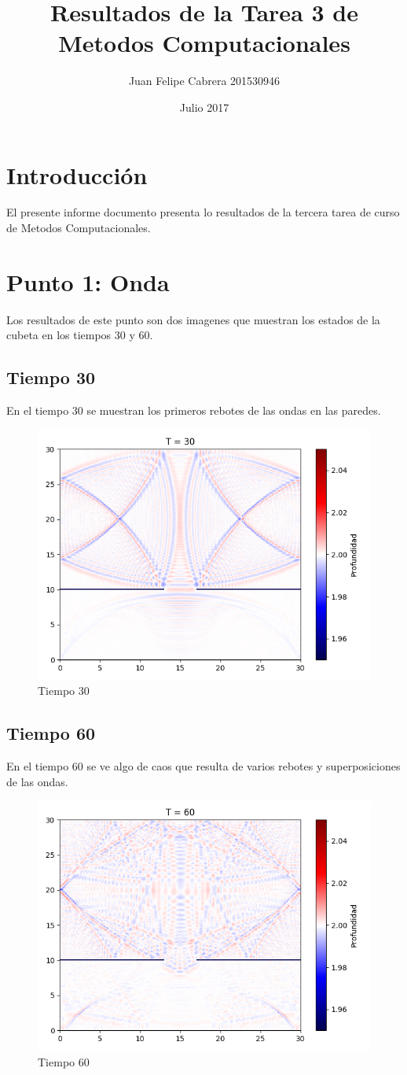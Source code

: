 \documentclass{article}
\title{Resultados de la Tarea 3 de Metodos Computacionales}
\author{Juan Felipe Cabrera 201530946}
\date{Julio 2017}
\begin{document}
\maketitle
{}

\section{Introducción}
El presente informe documento presenta lo resultados de la tercera tarea de curso de Metodos Computacionales.
\section{Punto 1: Onda}
Los resultados de este punto son dos imagenes que muestran los estados de la cubeta en los tiempos 30 y 60.
\subsection{Tiempo 30}
En el tiempo 30 se muestran los primeros rebotes de las ondas en las paredes.
\begin{figure}[H]
\centering
\includegraphics[scale=0.55]{30.png}
\caption{Tiempo 30}
\end{figure}
\newpage
\subsection{Tiempo 60}
En el tiempo 60 se ve algo de caos que resulta de varios rebotes y superposiciones de las ondas.
\begin{figure}[H]
\centering
\includegraphics[scale=0.55]{60.png}
\caption{Tiempo 60}
\end{figure}
\end{document}

